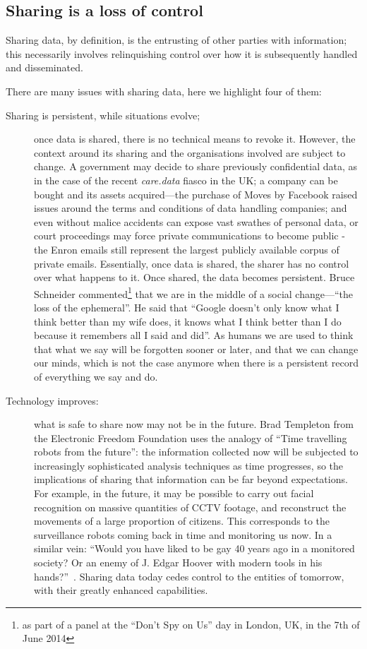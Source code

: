 \documentclass{IOS-Book-Article}     %
\newcommand{\tbox}[3][red]{{
\color{#1}\noindent{
   \fbox{\scriptsize{ {\bf #2} \textsl{#3}}}
   \vspace{2pt}
}
}}
\newcommand{\todo}[1]{\tbox{TODO:}{#1}}
\begin{document}
\subsection{Sharing is a loss of control}

Sharing data, by definition, is the entrusting of other parties with
information; this necessarily involves relinquishing control over how it is
subsequently handled and disseminated. 

There are many issues with sharing data, here we highlight four of them:
\begin{description}
  \item[Sharing is persistent, while situations evolve;] once data is shared,
  there is no technical means to revoke it. However, the context around its sharing and the
  organisations involved are subject to change. 
  A government may decide to share previously confidential data, as in the case of the recent \emph{care.data} fiasco in the UK; a company can be
bought and its assets acquired---the purchase of Moves by Facebook raised issues
around the terms and conditions of data handling companies; and even without
malice accidents can expose vast swathes of personal data, or court proceedings
may force private communications to become public - the Enron emails still
represent the largest publicly available corpus of private emails. Essentially,
once data is shared, the sharer has no control over what happens to it. Once shared, the data becomes persistent. Bruce Schneider commented\footnote{as part of a panel at the ``Don't Spy on Us'' day in London, UK, in the 7th of June 2014} that we are in the middle of a social change---``the loss of the ephemeral''. He said that ``Google doesn't only know what I think better than my wife does, it knows what I think better than I do because it remembers all I said and did''. As humans we are used to think that what we say will be forgotten sooner or later, and that we can change our minds, which is not the case anymore when there is a persistent record of everything we say and do.

\item[Technology improves:] what is safe to share now may not be in the
future. Brad Templeton from the Electronic Freedom Foundation uses the analogy
of ``Time travelling robots from the future'': the information collected now
will be subjected to increasingly sophisticated analysis techniques as time
progresses, so the implications of sharing that information can be far beyond
expectations. For example, in the future, it may be possible to carry out facial
recognition on massive quantities of CCTV footage, and reconstruct the movements
of a large proportion of citizens. This corresponds to the surveillance
robots coming back in time and monitoring us now. In a similar vein: ``Would
you have liked to be gay 40 years ago in a monitored society? Or an enemy of J.
Edgar Hoover with modern tools in his hands?''~\cite{templetonWatched}. Sharing
data today cedes control to the entities of tomorrow, with their greatly
enhanced capabilities.


\end{description}
\end{document}
